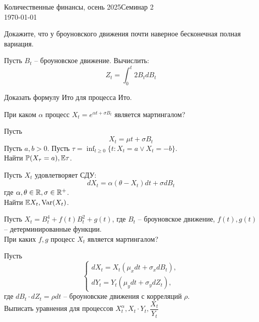 \documentclass[12pt]{article}
\begin{document}
\noindent Количественные финансы, осень 2025\hfill Семинар 2\\
\today

\hrulefill

\begin{problem}
    Докажите, что у броуновского движения почти наверное бесконечная полная вариация.
\end{problem}

\begin{problem}
    Пусть $B_t$ -- броуновское движение. Вычислить:
    $$
        Z_t = \int_0^t 2B_t dB_t
    $$
\end{problem}

\begin{problem}
    Доказать формулу Ито для процесса Ито.
\end{problem}

\begin{problem}
    При каком $\alpha$ процесс $X_t = e^{\alpha t + \sigma B_t}$ является мартингалом? 
\end{problem}

\begin{problem}
    Пусть 
    $$
        X_t = \mu t + \sigma B_t
    $$
    Пусть $a, b > 0$. Пусть $\tau = \inf_{t \geq 0} \{t: X_t = a \lor X_t = -b\}$.
    \\ Найти $\mathbb{P}(X_{\tau} = a), \mathbb{E} \tau$.
\end{problem}

\begin{problem}
    Пусть $X_t$ удовлетворяет СДУ:
    $$
        dX_t = \alpha (\theta -  X_t) dt + \sigma dB_t
    $$где $\alpha, \theta \in \mathbb{R}, \sigma \in \mathbb{R}^+$. \\
    Найти $\mathbb{E} X_t, \mathrm{Var}(X_t)$. 
\end{problem}
 
\begin{problem}
    Пусть $X_t = B_t^4 + f(t) B_t^2 + g(t)$, где $B_t$ -- броуновское движение, $f(t), g(t)$ -- детерминированные функции. 
    \\ При каких $f, g$ процесс $X_t$ является мартингалом? 
\end{problem}

\begin{problem}
    Пусть
    $$\begin{cases}
        dX_t = X_t (\mu_x dt + \sigma_x dB_t), \\
        dY_t = Y_t (\mu_y dt + \sigma_y dZ_t),
    \end{cases}$$
    где $dB_t\cdot dZ_t = \rho dt$ -- броуновские движения с корреляций $\rho$. 
    \\ Выписать уравнения для процессов $X_t^{\alpha}, X_t \cdot Y_t, \dfrac{X_t}{Y_t}$
\end{problem}
\end{document}
